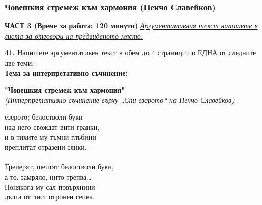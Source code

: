 \documentclass[12pt,a4paper]{article}
\begin{document}
\subsubsection{Човешкия стремеж към хармония (Пенчо Славейков)}
\vspace{0.5cm}
\begin{center}
\textbf{ЧАСТ 3 (Време за работа: 120 минути)}
\vspace{0.2cm}
{\textit{\underline{Аргументативния текст напишете в листа за отговори на предвиденото място.}}}
\vspace{0.1cm}
\end{center}
\textbf{41.} Напишете аргументативен текст в обем до 4 страници по ЕДНА от следните две теми:
\\
\vspace{0.2cm}
\textbf{Тема за интерпретативно съчинение:}
\vspace{0.1cm}
\begin{center}
\textbf{"Човешкия стремеж към хармония"}
\\
\textit{(Интерпретативно съчинение върху „Спи езерото“ на Пенчо Славейков)}
\end{center}
 езерото; белостволи буки\\
над него свождат вити гранки,\\
и в тихите му тъмни глъбини\\
преплитат отразени сянки.\\
\\
Треперят, шептят белостволи буки,\\
а то, замряло, нито трепва…\\
Понякога му сал повърхнини\\
дълга от лист отронен сепва.\\
\end{document}
